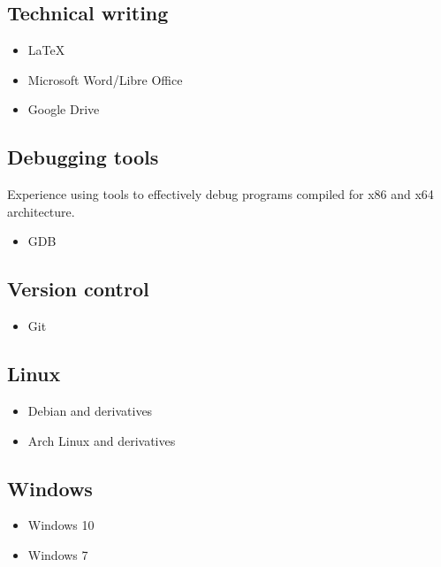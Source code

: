 \documentclass[letterpaper]{article}
\begin{document}
        \subsection*{Technical writing}

        \begin{itemize}[itemsep = 0pt]
            \item LaTeX
            \item Microsoft Word/Libre Office
            \item Google Drive
        \end{itemize}

        \subsection*{Debugging tools}
        Experience using tools to effectively debug programs compiled for x86 and x64 architecture.

        \begin{itemize}[itemsep = 0pt]
            \item GDB
        \end{itemize}

        \subsection*{Version control}

        \begin{itemize}[itemsep = 0pt]
            \item Git
        \end{itemize}

        \subsection*{Linux}

        \begin{itemize}[itemsep = 0pt]
            \item Debian and derivatives
            \item Arch Linux and derivatives
        \end{itemize}

        \subsection*{Windows}

        \begin{itemize}[itemsep = 0pt]
            \item Windows 10
            \item Windows 7
        \end{itemize}
\end{document}
